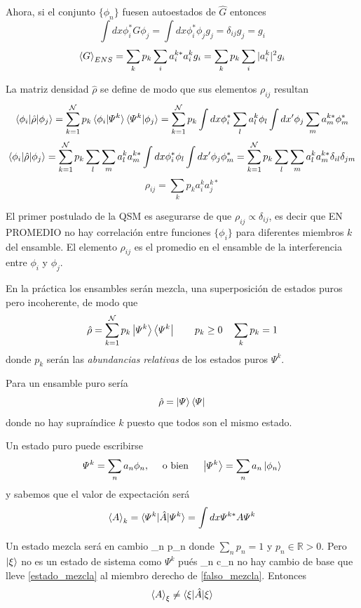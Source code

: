 \documentclass[10pt,oneside]{CBFT_book}
\begin{document}
Ahora, si el conjunto $\{ \phi_n \}$ fuesen autoestados de $\hat{G}$ entonces 
\[
	\int dx \phi_i^* G \phi_j = \int dx \phi_i^* \phi_j g_j = \delta_{ij} g_j = g_i
\]
\[
	\braket{G}_{ENS} = \sum_k p_k \sum_i a_i^{k*}  a_i^k g_i = 
	\sum_k p_k \sum_i |a_i^k|^2 g_i
\]

La matriz densidad $\hat{\rho}$ se define de modo que sus elementos $\rho_{ij}$ resultan 
\[
	\braket{\phi_i|\hat{\rho}|\phi_j} = \sum_{k=1}^{\mathcal{N}} p_k \braket{\phi_i|\Psi^k} \braket{\Psi^k|\phi_j} =
	\sum_{k=1}^{\mathcal{N}} p_k \int dx \phi^*_i \sum_l a_l^k \phi_l \int dx' \phi_j \sum_m a_m^{k*} \phi_m^*
\]
\[
	\braket{\phi_i|\hat{\rho}|\phi_j} = 
	\sum_{k=1}^{\mathcal{N}} p_k \sum_l \sum_m a_l^k a_m^{k*} \int dx \phi^*_i \phi_l \int dx' \phi_j \phi_m^* =
	\sum_{k=1}^{\mathcal{N}} p_k \sum_l \sum_m a_l^k a_m^{k*} \delta_{il}\delta_{jm}
\]
\[
	\rho_{ij} = \sum_k p_k a_i^k a_j^{k*}
\]

El primer postulado de la QSM es asegurarse de que $\rho_{ij} \propto \delta_{ij} $, es decir que
EN PROMEDIO no hay correlación entre funciones $\{ \phi_i \}$ para diferentes miembros $k$ del ensamble.
El elemento $\rho_{ij}$ es el promedio en el ensamble de la interferencia entre $\phi_i$ y $\phi_j$.


En la práctica los ensambles serán mezcla, una superposición de estados puros pero incoherente, de modo
que 
\[
	\hat{\rho} = \sum_{k=1}^{\mathcal{N}} p_k \Ket{\Psi^k}\Bra{\Psi^k} \qquad p_k \geq 0 \quad \sum_k p_k = 1 
\]
donde $p_k$ serán las {\it abundancias relativas} de los estados puros $\Psi^k$.

Para un ensamble puro sería
\[
	\hat{\rho} = \Ket{\Psi}\Bra{\Psi}
\]
donde no hay supraíndice $k$ puesto que todos son el mismo estado.

Un estado puro puede escribirse 
\[
	\Psi^k = \sum_n a_n \phi_n, \quad \text{ o bien }\quad \Ket{\Psi^k} = \sum_n a_n \Ket{\phi_n}
\]
y sabemos que el valor de expectación será
\[
	\braket{A}_k = \braket{\Psi^k|\hat{A}|\Psi^k} = \int dx \Psi^{k*} A \Psi^k
\]

Un estado mezcla será en cambio 
\be
	\Ket{\xi} \cong \sum_n p_n
	\label{estado_mezcla}	
\ee
donde $\sum_n p_n =1$ y $p_n \in \mathbb{R}>0$. Pero $\Ket{\xi} $ no es un estado de sistema como $\Psi^k$ pués
\be
	\Ket{\xi} \neq \sum_n c_n
	\label{falso_mezcla}
\ee
no hay cambio de base que lleve \eqref{estado_mezcla} al miembro derecho de \eqref{falso_mezcla}.
Entonces
\[
	\braket{A}_\xi \neq \braket{\xi|\hat{A}|\xi}
\]
\end{document}
